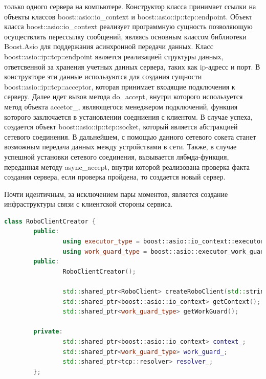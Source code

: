 \documentclass[a4paper, 14pt]{extreport}
\begin{document}
только одного сервера на компьютере. Конструктор класса принимает ссылки на объекты классов boost::asio::io\_context и
boost::asio::ip::tcp::endpoint. Объект класса boost::asio::io\_context реализует программную сущность позволяющую осуществлять перессылку 
сообщений, являясь основным классом библиотеки Boost.Asio для поддержания асинхронной передачи данных. Класс boost::asio::ip::tcp::endpoint
является реализацией структуры данных, ответсвенной за хранения учетных данных сервера, таких как ip-адресс и порт. В конструкторе эти 
данные используются для создания сущности boost::asio::ip::tcp::acceptor, которая принимает входящие подключения к серверу. Далее идет 
вызов метода do\_accept, внутри которого используется метод объекта accetor\_, являющегося менеджером подключений, функция которого 
заключается в установлении соедниения с клиентом. В случае успеха, создается объект boost::asio::ip::tcp::socket, который является 
абстракцией сетевого соединения. В дальнейшем, с помощью данного сетевого сокета станет возможным передача данных между устройствами в 
сети. Также, в случае успешной установки сетевого соединения, вызывается лябмда-функция, переданная методу async\_accept, внутри которой 
реализована проверка факта создания сервера, если проверка пройдена, то создается новый сервер. 
\par Почти идентичным, за исключением пары моментов, является создание инфраструктуры связи с клиентской стороны сервиса.
\begin{lstlisting}[language=C++, frame=single, xleftmargin=15pt, caption={Заголовочный файл класса RoboClientCreator},label=DescriptiveLabel]
class RoboClientCreator {
        public:
                using executor_type = boost::asio::io_context::executor_type;
                using work_guard_type = boost::asio::executor_work_guard<executor_type>;
        public:
                RoboClientCreator();
        
                std::shared_ptr<RoboClient> createRoboClient(std::string& ip,std::string& port);
                std::shared_ptr<boost::asio::io_context> getContext();
                std::shared_ptr<work_guard_type> getWorkGuard();
        
        private:
                std::shared_ptr<boost::asio::io_context> context_;
                std::shared_ptr<work_guard_type> work_guard_;
                std::shared_ptr<tcp::resolver> resolver_;
        };
\end{lstlisting}
\end{document}
